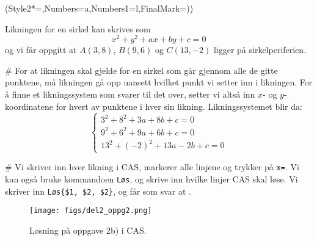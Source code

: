 \begin{easylist}[enumerate]
	\ListProperties(Style2*=,Numbers=a,Numbers1=l,FinalMark={)})

	Likningen for en sirkel kan skrives som
	\begin{equation*}
		x^2 + y^2 + ax + by + c = 0
	\end{equation*}
	og vi får oppgitt at $A(3,8)$, $B(9,6)$ og $C(13,-2)$ ligger på sirkelperiferien. 
	
	# For at likningen skal gjelde for en sirkel som går gjennom alle de gitte punktene, må likningen gå opp uansett hvilket punkt vi setter inn i likningen. 
	For å finne et likningssystem som svarer til det over, setter vi altså inn $x$- og $y$-koordinatene for hvert av punktene i hver sin likning. 
	Likningssystemet blir da:
	\begin{equation*}
		\begin{cases} 3^2 + 8^2 + 3a + 8b + c = 0
		\\ 9^2 + 6^2 + 9a + 6b + c = 0 
		\\ 13^2 + (-2)^2 + 13a - 2b + c = 0 
		\end{cases}
	\end{equation*}
	
	# Vi skriver inn hver likning i CAS, markerer alle linjene og trykker på \verb|x=|. 
	Vi kan også bruke kommandoen \verb|Løs|, og skrive inn hvilke linjer CAS skal løse. 
	Vi skriver inn \verb|Løs{$1, $2, $2}|, og får som svar at .
	\begin{figure}[ht!]
		\centering
		\texttt{[image: figs/del2\_oppg2.png]}
		\caption{Løsning på oppgave 2b) i CAS.}
		\label{fig:del1_oppg7}
	\end{figure}
\end{easylist}


